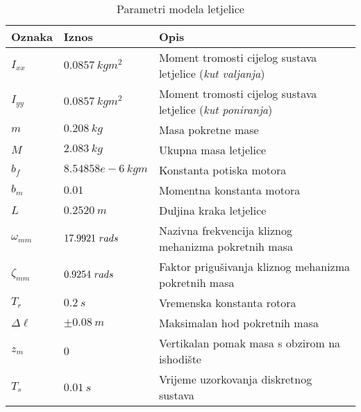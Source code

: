 \documentclass[11pt,a4paper]{article}
\begin{document}
\setlength\extrarowheight{1pt}
\begin{table}[h]
\centering
\caption{Parametri modela letjelice}
\label{params}
\begin{tabular}{lll}
\hline
\textbf{Oznaka} &  \textbf{Iznos}  &  \textbf{Opis}   \\ \hline 
$I_{xx}$ & $0.0857 \ kgm^{2}$ & Moment tromosti cijelog sustava letjelice (\textit{kut valjanja})   \\ 
$I_{yy}$ & $0.0857 \ kg m^{2}$ &  Moment tromosti cijelog sustava letjelice (\textit{kut poniranja})\\ 
$m$ & $0.208 \ kg$ &  Masa pokretne mase    \\ 
$M$ & $2.083 \ kg$ & Ukupna masa letjelice      \\ 
$b_{f}$ & $8.54858e-6 \ kgm$& Konstanta potiska motora     \\ 
$b_{m}$ & $0.01$& Momentna konstanta motora     \\ 
$ L$ & $0.2520 \ m $ &  Duljina kraka letjelice    \\ 
$\omega_{mm} $ & $ 17.9921 \ rad\/s$ & Nazivna frekvencija kliznog mehanizma pokretnih masa     \\
$\zeta_{mm} $ & $ 0.9254 \ rad\/s$ & Faktor prigušivanja kliznog mehanizma pokretnih masa      \\  
$T_{r} $ & $ 0.2 \ s$ &  Vremenska konstanta rotora    \\
$\Delta \ell $ & $\pm0.08 \ m $ &  Maksimalan hod pokretnih masa    \\  
$z_{m} $ & $ 0$ & Vertikalan pomak masa s obzirom na ishodište     \\ 
$T_{s} $ & $ 0.01 \ s$ &  Vrijeme uzorkovanja diskretnog sustava    \\ \hline
\end{tabular}
\end{table}
\end{document}
